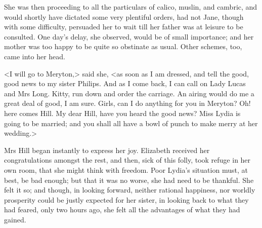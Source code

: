 She was then proceeding to all the particulars of calico, muslin, and cambric, and would shortly have dictated some very plentiful orders, had not Jane, though with some difficulty, persuaded her to wait till her father was at leisure to be consulted. One day's delay, she observed, would be of small importance; and her mother was too happy to be quite so obstinate as usual. Other schemes, too, came into her head.

<I will go to Meryton,> said she, <as soon as I am dressed, and tell the good, good news to my sister Philips. And as I come back, I can call on Lady Lucas and Mrs Long. Kitty, run down and order the carriage. An airing would do me a great deal of good, I am sure. Girls, can I do anything for you in Meryton? Oh! here comes Hill. My dear Hill, have you heard the good news? Miss Lydia is going to be married; and you shall all have a bowl of punch to make merry at her wedding.>

Mrs Hill began instantly to express her joy. Elizabeth received her congratulations amongst the rest, and then, sick of this folly, took refuge in her own room, that she might think with freedom. Poor Lydia's situation must, at best, be bad enough; but that it was no worse, she had need to be thankful. She felt it so; and though, in looking forward, neither rational happiness, nor worldly prosperity could be justly expected for her sister, in looking back to what they had feared, only two hours ago, she felt all the advantages of what they had gained.